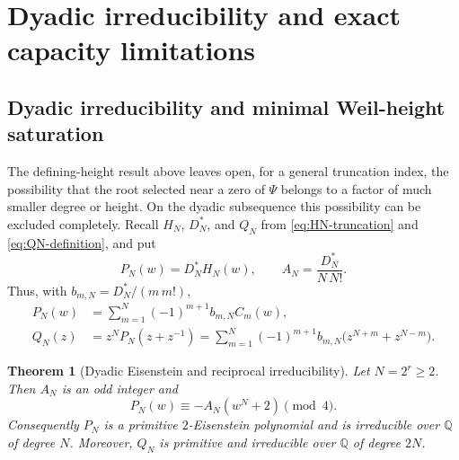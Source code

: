 \documentclass[11pt]{article}
\newtheorem{theorem}{Theorem}[section]
\theoremstyle{definition}
\theoremstyle{remark}
\newcommand{\Q}{\mathbb Q}
\begin{document}
\section{Dyadic irreducibility and exact capacity limitations}
\label{sec:dyadic-capacity}

\subsection{Dyadic irreducibility and minimal Weil-height saturation}
\label{subsec:dyadic-irreducibility}

The defining-height result above leaves open, for a general truncation
index, the possibility that the root selected near a zero of \(\Psi\)
belongs to a factor of much smaller degree or height.  On the dyadic
subsequence this possibility can be excluded completely.  Recall
\(H_N\), \(D_N^*\), and \(Q_N\) from
\eqref{eq:HN-truncation} and \eqref{eq:QN-definition}, and put
\begin{equation}\label{eq:PN-AN-dyadic}
 P_N(w)=D_N^*H_N(w),
 \qquad
 A_N=\frac{D_N^*}{N\,N!}.
\end{equation}
Thus, with \(b_{m,N}=D_N^*/(m\,m!)\),
\begin{align}
 P_N(w)
 &=\sum_{m=1}^N(-1)^{m+1}b_{m,N}C_m(w),
 \label{eq:PN-chebyshev}\\
 Q_N(z)
 &=z^NP_N(z+z^{-1})
   =\sum_{m=1}^N(-1)^{m+1}b_{m,N}
       \bigl(z^{N+m}+z^{N-m}\bigr).
 \label{eq:QN-dyadic-explicit}
\end{align}

\begin{theorem}[Dyadic Eisenstein and reciprocal irreducibility]
\label{thm:dyadic-reciprocal-irreducibility}
Let \(N=2^r\geq2\).  Then \(A_N\) is an odd integer and
\begin{equation}\label{eq:PN-mod-four}
 \boxed{P_N(w)\equiv-A_N(w^N+2)\pmod 4.}
\end{equation}
Consequently \(P_N\) is a primitive \(2\)-Eisenstein polynomial and is
irreducible over \(\Q\) of degree \(N\).  Moreover, \(Q_N\) is primitive
and irreducible over \(\Q\) of degree \(2N\).
\end{theorem}
\end{document}
